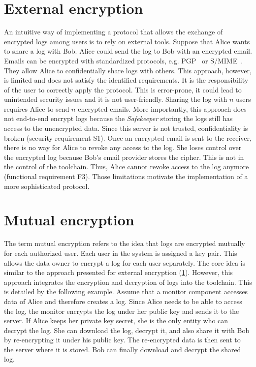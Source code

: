 \documentclass[../main.tex]{subfiles}
\begin{document}
\section{External encryption}
\label{sec:external-encryption}
An intuitive way of implementing a protocol that allows the exchange of encrypted logs among users is to rely on external tools.
Suppose that Alice wants to share a log with Bob.
Alice could send the log to Bob with an encrypted email.
Emails can be encrypted with standardized protocols, e.g. PGP~\cite{OpenPGP2007} or S/MIME~\cite{SMIME2009}.
They allow Alice to confidentially share logs with others.
This approach, however, is limited and does not satisfy the identified requirements.
It is the responsibility of the user to correctly apply the protocol.
This is error-prone, it could lead to unintended security issues and it is not user-friendly.
Sharing the log with $n$ users requires Alice to send $n$ encrypted emails.
More importantly, this approach does not end-to-end encrypt logs because the \emph{Safekeeper} storing the logs still has access to the unencrypted data.
Since this server is not trusted, confidentiality is broken (security requirement S1).
Once an encrypted email is sent to the receiver, there is no way for Alice to revoke any access to the log.
She loses control over the encrypted log because Bob's email provider stores the cipher.
This is not in the control of the toolchain.
Thus, Alice cannot revoke access to the log anymore (functional requirement F3).
Those limitations motivate the implementation of a more sophisticated protocol.

\section{Mutual encryption}
\label{sec:mutual-encryption}
The term mutual encryption refers to the idea that logs are encrypted mutually for each authorized user.
Each user in the system is assigned a key pair.
This allows the data owner to encrypt a log for each user separately.
The core idea is similar to the approach presented for external encryption (\cref{sec:external-encryption}).
However, this approach integrates the encryption and decryption of logs into the toolchain.
This is detailed by the following example.
Assume that a monitor component accesses data of Alice and therefore creates a log.
Since Alice needs to be able to access the log, the monitor encrypts the log under her public key and sends it to the server.
If Alice keeps her private key secret, she is the only entity who can decrypt the log.
She can download the log, decrypt it, and also share it with Bob by re-encrypting it under his public key.
The re-encrypted data is then sent to the server where it is stored.
Bob can finally download and decrypt the shared log.
\end{document}
